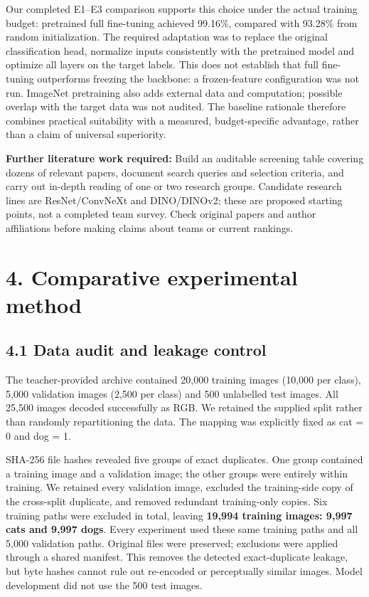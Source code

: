 \documentclass[
  10pt,
  a4paper,
]{article}
\begin{document}
Our completed E1--E3 comparison supports this choice under the actual
training budget: pretrained full fine-tuning achieved 99.16\%, compared
with 93.28\% from random initialization. The required adaptation was to
replace the original classification head, normalize inputs consistently
with the pretrained model and optimize all layers on the target labels.
This does not establish that full fine-tuning outperforms freezing the
backbone: a frozen-feature configuration was not run. ImageNet
pretraining also adds external data and computation; possible overlap
with the target data was not audited. The baseline rationale therefore
combines practical suitability with a measured, budget-specific
advantage, rather than a claim of universal superiority.

\textbf{Further literature work required:} Build an auditable screening
table covering dozens of relevant papers, document search queries and
selection criteria, and carry out in-depth reading of one or two
research groups. Candidate research lines are ResNet/ConvNeXt and
DINO/DINOv2; these are proposed starting points, not a completed team
survey. Check original papers and author affiliations before making
claims about teams or current rankings.

\section{4. Comparative experimental
method}\label{comparative-experimental-method}

\subsection{4.1 Data audit and leakage
control}\label{data-audit-and-leakage-control}

The teacher-provided archive contained 20,000 training images (10,000
per class), 5,000 validation images (2,500 per class) and 500 unlabelled
test images. All 25,500 images decoded successfully as RGB. We retained
the supplied split rather than randomly repartitioning the data. The
mapping was explicitly fixed as cat = 0 and dog = 1.

SHA-256 file hashes revealed five groups of exact duplicates. One group
contained a training image and a validation image; the other groups were
entirely within training. We retained every validation image, excluded
the training-side copy of the cross-split duplicate, and removed
redundant training-only copies. Six training paths were excluded in
total, leaving \textbf{19,994 training images: 9,997 cats and 9,997
dogs}. Every experiment used these same training paths and all 5,000
validation paths. Original files were preserved; exclusions were applied
through a shared manifest. This removes the detected exact-duplicate
leakage, but byte hashes cannot rule out re-encoded or perceptually
similar images. Model development did not use the 500 test images.
\end{document}
